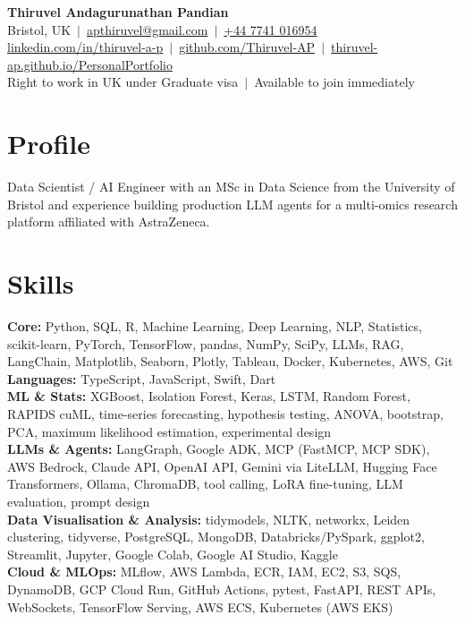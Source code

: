 \documentclass[a4paper,11pt]{article}
\begin{document}
\fontsize{11}{13.2}\selectfont

\begin{center}
  {\LARGE\bfseries Thiruvel Andagurunathan Pandian}\\[3pt]
  Bristol, UK \,$|$\, \href{mailto:apthiruvel@gmail.com}{apthiruvel@gmail.com} \,$|$\, \href{tel:+447741016954}{+44 7741 016954}\\[1pt]
\href{https://www.linkedin.com/in/thiruvel-a-p/}{linkedin.com/in/thiruvel-a-p} \,$|$\, \href{https://github.com/Thiruvel-AP}{github.com/Thiruvel-AP} \,$|$\, \href{https://thiruvel-ap.github.io/PersonalPortfolio/}{thiruvel-ap.github.io/PersonalPortfolio}\\[1pt]
  Right to work in UK under Graduate visa \,$|$\, Available to join immediately
\end{center}

\section{Profile}
Data Scientist / AI Engineer with an MSc in Data Science from the University of Bristol and experience building production LLM agents for a multi-omics research platform affiliated with AstraZeneca.

\section{Skills}
\textbf{Core:} Python, SQL, R, Machine Learning, Deep Learning, NLP, Statistics, scikit-learn, PyTorch, TensorFlow, pandas, NumPy, SciPy, LLMs, RAG, LangChain, Matplotlib, Seaborn, Plotly, Tableau, Docker, Kubernetes, AWS, Git\\[2pt]
\textbf{Languages:} TypeScript, JavaScript, Swift, Dart\\[2pt]
\textbf{ML \& Stats:} XGBoost, Isolation Forest, Keras, LSTM, Random Forest, RAPIDS cuML, time-series forecasting, hypothesis testing, ANOVA, bootstrap, PCA, maximum likelihood estimation, experimental design\\[2pt]
\textbf{LLMs \& Agents:} LangGraph, Google ADK, MCP (FastMCP, MCP SDK), AWS Bedrock, Claude API, OpenAI API, Gemini via LiteLLM, Hugging Face Transformers, Ollama, ChromaDB, tool calling, LoRA fine-tuning, LLM evaluation, prompt design\\[2pt]
\textbf{Data Visualisation \& Analysis:} tidymodels, NLTK, networkx, Leiden clustering, tidyverse, PostgreSQL, MongoDB, Databricks/PySpark, ggplot2, Streamlit, Jupyter, Google Colab, Google AI Studio, Kaggle\\[2pt]
\textbf{Cloud \& MLOps:} MLflow, AWS Lambda, ECR, IAM, EC2, S3, SQS, DynamoDB, GCP Cloud Run, GitHub Actions, pytest, FastAPI, REST APIs, WebSockets, TensorFlow Serving, AWS ECS, Kubernetes (AWS EKS)
\end{document}
